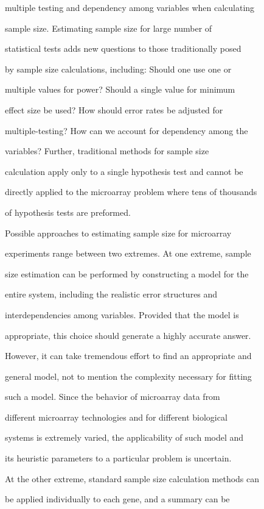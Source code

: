 \documentclass[12pt]{article}
\begin{document}
multiple testing and dependency among variables when calculating

sample size. Estimating sample size for large number of

statistical tests adds new questions to those traditionally posed

by sample size calculations, including: Should one use one or

multiple values for power? Should a single value for minimum

effect size be used?  How should error rates be adjusted for

multiple-testing?  How can we account for dependency among the

variables?  Further, traditional methods for sample size

calculation apply only to a single hypothesis test and cannot be

directly applied to the microarray problem where tens of thousands

of hypothesis tests are preformed.



Possible approaches to estimating sample size for microarray

experiments range between two extremes. At one extreme, sample

size estimation can be performed by constructing a model for the

entire system, including the realistic error structures and

interdependencies among variables. Provided that the model is

appropriate, this choice should generate a highly accurate answer.

However, it can take tremendous effort to find an appropriate and

general model, not to mention the complexity necessary for fitting

such a model.  Since the behavior of microarray data from

different microarray technologies and for different biological

systems is extremely varied, the applicability of such model and

its heuristic parameters to a particular problem is uncertain.



At the other extreme, standard sample size calculation methods can

be applied individually to each gene, and a summary can be
\end{document}
